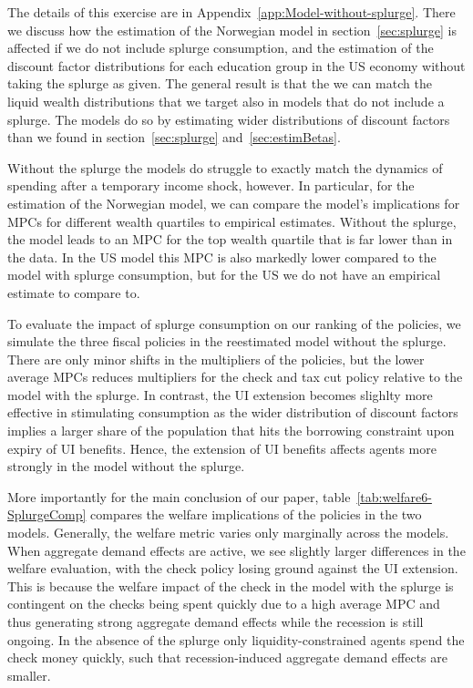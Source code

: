 \documentclass[qe]{econsocart}
\begin{document}
The details of this exercise are in Appendix~\ref{app:Model-without-splurge}.
There we discuss how the estimation of the Norwegian model in section~\ref{sec:splurge} is affected if we do not include splurge consumption, and the estimation of the discount factor distributions for each education group in the US economy without taking the splurge as given.
The general result is that the we can match the liquid wealth distributions that we target also in models that do not include a splurge.
The models do so by estimating wider distributions of discount factors than we found in section~\ref{sec:splurge} and~\ref{sec:estimBetas}.

Without the splurge the models do struggle to exactly match the dynamics of spending after a temporary income shock, however.
In particular, for the estimation of the Norwegian model, we can compare the model's implications for MPCs for different wealth quartiles to empirical estimates.
Without the splurge, the model leads to an MPC for the top wealth quartile that is far lower than in the data.
In the US model this MPC is also markedly lower compared to the model with splurge consumption, but for the US we do not have an empirical estimate to compare to.

To evaluate the impact of splurge consumption on our ranking of the policies, we simulate the three fiscal policies in the reestimated model without the splurge.
There are only minor shifts in the multipliers of the policies, but the lower average MPCs reduces multipliers for the check and tax cut policy relative to the model with the splurge.
In contrast, the UI extension becomes slighlty more effective in stimulating consumption as the wider distribution of discount factors implies a larger share of the population that hits the borrowing constraint upon expiry of UI benefits.
Hence, the extension of UI benefits affects agents more strongly in the model without the splurge.

More importantly for the main conclusion of our paper, table~\ref{tab:welfare6-SplurgeComp} compares the welfare implications of the policies in the two models.
Generally, the welfare metric varies only marginally across the models.
When aggregate demand effects are active, we see slightly larger differences in the welfare evaluation, with the check policy losing ground against the UI extension.
This is because the welfare impact of the check in the model with the splurge is contingent on the checks being spent quickly due to a high average MPC and thus generating strong aggregate demand effects while the recession is still ongoing.
In the absence of the splurge only liquidity-constrained agents spend the check money quickly, such that recession-induced aggregate demand effects are smaller.
\end{document}
